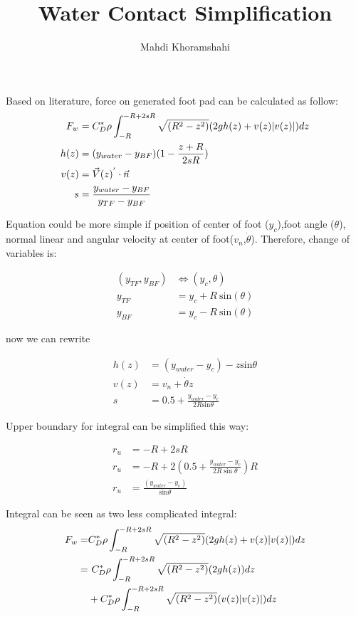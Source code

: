 \documentclass{article}
\DeclarePairedDelimiter\abs{\lvert}{\rvert}%
\begin{document}
\title{Water Contact Simplification}
\author{Mahdi Khoramshahi}
\maketitle




Based on literature, force on generated foot pad can be calculated as follow:
\begin{align}\label{eq:spliting}
	F_w &= C_{D}^* \rho \int_{-R}^{-R+2sR} \sqrt{( R^2-z^2)} (2gh(z)+v(z)\abs{v(z)})dz\\
	h(z)&= (y_{water}-y_{BF})(1-\frac{z+R}{2sR})\\
	v(z) &= \vec{V}(z)^{'} \cdot \vec{n}\\
	s   &= \frac{y_{water}-y_{BF}}{y_{TF}-y_{BF}}
\end{align}

Equation could be more simple if  position of center of foot ($y_c$),foot angle ($\theta$), normal linear and angular velocity at center of foot($v_n$,$\dot{\theta}$). Therefore, change of variables is: 

\begin{align}\label{eq:spliting}
	\left( y_{TF},y_{BF} \right) &\Leftrightarrow \left( y_c, \theta \right)\\
	y_{TF} &= y_c + R~\mathrm{sin}(\theta)\\
	y_{BF} &= y_c - R~\mathrm{sin}(\theta)
\end{align}

now we can rewrite 



\begin{align}\label{eq:spliting}
	h(z)&= (y_{water}-y_{c})-z\mathrm{sin}\theta\\
	v(z) &= v_n + \dot{\theta}z\\
	s   &= 0.5+\frac{y_{water}-y_c}{2R\mathrm{sin}\theta}
\end{align}

Upper boundary for integral can be simplified this way:

\begin{align}\label{eq:spliting}
	r_u &= -R+2sR \\
	r_u &= -R+ 2 \left( 0.5+\frac{y_{water}-y_c}{2R\sin\theta} \right) R \\
	r_u &= \frac{ \left( y_{water}-{y_c} \right) }{\mathrm{sin}\theta}
\end{align}

Integral can be seen as two less complicated integral:
\begin{align}\label{eq:spliting}
	F_w =& C_{D}^* \rho \int_{-R}^{-R+2sR} \sqrt{( R^2-z^2)} (2gh(z)+v(z)\abs{v(z)})dz\\
		=& ~C_{D}^* \rho \int_{-R}^{-R+2sR} \sqrt{( R^2-z^2)} (2gh(z))dz \\
		 & + C_{D}^* \rho \int_{-R}^{-R+2sR} \sqrt{( R^2-z^2)} (v(z)\abs{v(z)})dz
\end{align}
\end{document}
